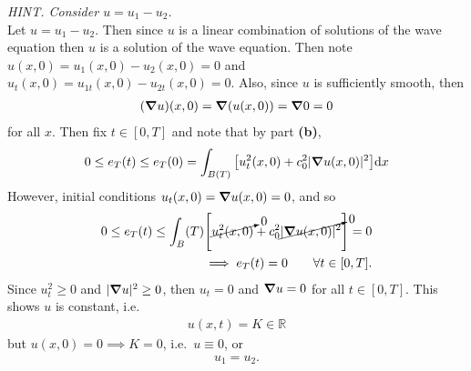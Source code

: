 \begin{enumerate}[\bf (a)]
        \emph{HINT.  Consider $u = u_1 - u_2$.} \\

        Let $u = u_1 - u_2$.  Then since $u$ is a linear combination of solutions of the wave equation then $u$ is a solution of the wave equation.  Then note $u(x,0) = u_1(x,0) - u_2(x,0) = 0$ and $u_t(x,0) = u_{1t}(x,0) - u_{2t}(x,0) = 0$.  Also, since $u$ is sufficiently smooth, then
        \begin{align*}
            (\grad u)(x,0) = \grad(u(x,0)) = \grad 0 = 0
        \end{align*}
        for all $x$.  Then fix $t \in [0, T]$ and note that by part \textbf{(b)},
        \begin{align*}
            0 \leq e_T(t) \leq e_T(0) = \int_{B(T)}\qty[u_t^2(x,0) + c_0^2|\grad u(x,0)|^2]\dd x
        \end{align*}
        However, initial conditions $u_t(x,0) = \grad u(x,0) = 0$, and so
        \begin{align*}
            0 \leq e_T(t) \leq \int_B(T) \qty[\cancelto{0}{u_t^2(x,0)} + c_0^2\cancelto{0}{|\grad u (x,0)|^2}] = 0 \\
            \implies e_T(t) = 0 \qquad \forall t \in [0,T].
        \end{align*}
        Since $u_t^2 \geq 0$ and $|\grad u|^2 \geq 0$, then $u_t = 0$ and $\grad u = 0$ for all $t \in [0, T]$.  This shows $u$ is constant, i.e.
        \begin{align*}
            u(x,t) = K \in \mathbb{R}
        \end{align*}
        but $u(x,0) = 0 \implies K = 0$, i.e.~$u \equiv 0$, or
        \begin{align*}
            u_1 = u_2.
        \end{align*}
\end{enumerate}
